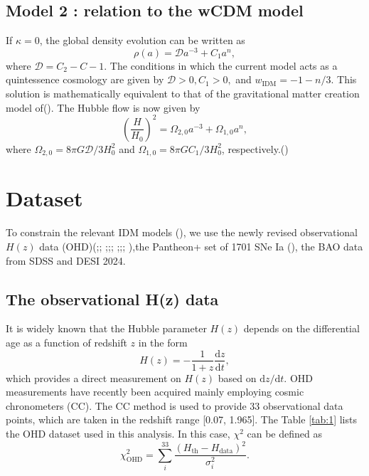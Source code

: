 \documentclass{aa}
\begin{document}
\subsection{Model 2 : relation to the wCDM model}

   If $\kappa=0$, the global density evolution can be written as
   \begin{equation}
      \rho(a)=\mathcal{D}a^{-3}+C_1a^{n},
   \end{equation}
   where $\mathcal{D}=C_2-C-1$. The conditions in which the current 
   model acts as a quintessence cosmology are given by $\mathcal{D}>0,
   C_1>0,$ and $w_{\text{IDM}}=-1-n/3$. This solution is mathematically
   equivalent to that of the gravitational matter creation model of().
   The Hubble flow is now given by
   \begin{equation}
      \left(\frac{H}{H_0}\right)^2=\Omega_{2,0}a^{-3}+\Omega_{1,0}a^{n},
   \end{equation}
   where $\Omega_{2,0}=8\pi G\mathcal{D}/3H_0^2$ and 
   $\Omega_{1,0}=8\pi GC_1/3H_0^2$, respectively.(\cite{refId0})
   
\section{Dataset}

   To constrain the relevant IDM models (\cite{refId0}), we use the newly revised
   observational $H(z)$ data (OHD)(\cite{Zhang_2014};\cite{PhysRevD.71.123001};
   \cite{Daniel.Stern_2010};\cite{M.Moresco_2012};\cite{Moresco_2016};
   \cite{10.1093/mnras/stx301};\cite{10.1093/mnrasl/slv037};\cite{Borghi_2022};
   \cite{Jiao_2023}),the Pantheon+ set of 1701 SNe Ia (\cite{Scolnic_2022}),
   the BAO data from SDSS and DESI 2024.

\subsection{The observational H(z) data}

   It is widely known that the Hubble parameter $H(z)$ depends on
   the differential age as a function of redshift $z$ in the form
   \begin{equation}
      H(z)=-\frac{1}{1+z}\frac{\mathrm{d}z}{\mathrm{d}t},
   \end{equation}
   which provides a direct measurement on $H(z)$ based on
   $\mathrm{d}z/\mathrm{d}t$.
   OHD measurements have recently been acquired mainly employing
   cosmic chronometers (CC). The CC method is used to provide 33 observational
   data points, which are taken in the redshift range [0.07, 1.965].
   The Table \ref{tab:1} lists the OHD dataset used in this analysis.
   In this case, $\chi^2$ can be defined as
   \begin{equation}
      \chi_{\text{OHD}}^2=\sum_i^{33}\frac{(H_{\text{th}}-H_{\text{data}})^2}{\sigma_i^2}.
   \end{equation}
\end{document}
